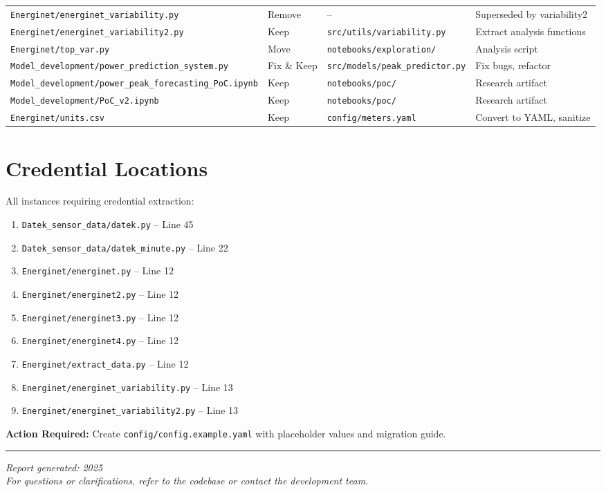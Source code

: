 \documentclass[11pt,a4paper]{article}
\begin{document}
\begin{longtable}{p{4cm} p{2cm} p{4.5cm} p{4cm}}
\texttt{Energinet/energinet\_variability.py} & Remove & -- & Superseded by variability2 \\
\texttt{Energinet/energinet\_variability2.py} & Keep & \texttt{src/utils/variability.py} & Extract analysis functions \\
\texttt{Energinet/top\_var.py} & Move & \texttt{notebooks/exploration/} & Analysis script \\
\texttt{Model\_development/power\_prediction\_system.py} & Fix \& Keep & \texttt{src/models/peak\_predictor.py} & Fix bugs, refactor \\
\texttt{Model\_development/power\_peak\_forecasting\_PoC.ipynb} & Keep & \texttt{notebooks/poc/} & Research artifact \\
\texttt{Model\_development/PoC\_v2.ipynb} & Keep & \texttt{notebooks/poc/} & Research artifact \\
\texttt{Energinet/units.csv} & Keep & \texttt{config/meters.yaml} & Convert to YAML, sanitize \\
\end{longtable}

\section{Credential Locations}

All instances requiring credential extraction:

\begin{enumerate}
    \item \texttt{Datek\_sensor\_data/datek.py} -- Line 45
    \item \texttt{Datek\_sensor\_data/datek\_minute.py} -- Line 22
    \item \texttt{Energinet/energinet.py} -- Line 12
    \item \texttt{Energinet/energinet2.py} -- Line 12
    \item \texttt{Energinet/energinet3.py} -- Line 12
    \item \texttt{Energinet/energinet4.py} -- Line 12
    \item \texttt{Energinet/extract\_data.py} -- Line 12
    \item \texttt{Energinet/energinet\_variability.py} -- Line 13
    \item \texttt{Energinet/energinet\_variability2.py} -- Line 13
\end{enumerate}

\textbf{Action Required:} Create \texttt{config/config.example.yaml} with placeholder values and migration guide.

\vspace{1cm}
\hrule
\vspace{0.5cm}

\noindent\textit{Report generated: 2025}\\

\noindent\textit{For questions or clarifications, refer to the codebase or contact the development team.}
\end{document}
